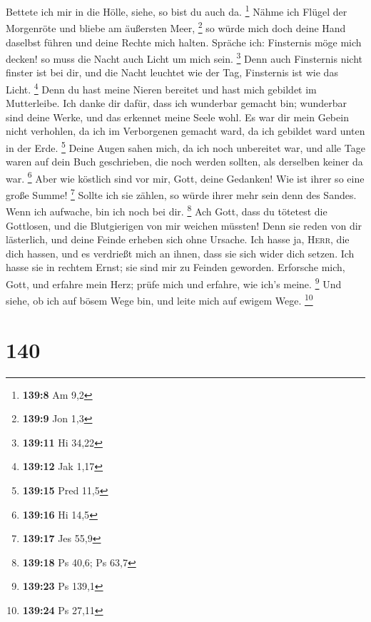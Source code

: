 Bettete ich mir in die Hölle, siehe, so bist du auch da. \footnote{\textbf{139:8}
  Am 9,2}  Nähme ich Flügel der Morgenröte und bliebe am
äußersten Meer, \footnote{\textbf{139:9} Jon 1,3}  so
würde mich doch deine Hand daselbst führen und deine Rechte mich halten.
 Spräche ich: Finsternis möge mich decken! so muss die
Nacht auch Licht um mich sein. \footnote{\textbf{139:11} Hi 34,22}
 Denn auch Finsternis nicht finster ist bei dir, und die
Nacht leuchtet wie der Tag, Finsternis ist wie das Licht. \footnote{\textbf{139:12}
  Jak 1,17}  Denn du hast meine Nieren bereitet und hast
mich gebildet im Mutterleibe.  Ich danke dir dafür, dass
ich wunderbar gemacht bin; wunderbar sind deine Werke, und das erkennet
meine Seele wohl.  Es war dir mein Gebein nicht
verhohlen, da ich im Verborgenen gemacht ward, da ich gebildet ward
unten in der Erde. \footnote{\textbf{139:15} Pred 11,5} 
Deine Augen sahen mich, da ich noch unbereitet war, und alle Tage waren
auf dein Buch geschrieben, die noch werden sollten, als derselben keiner
da war. \footnote{\textbf{139:16} Hi 14,5}  Aber wie
köstlich sind vor mir, Gott, deine Gedanken! Wie ist ihrer so eine große
Summe! \footnote{\textbf{139:17} Jes 55,9}  Sollte ich
sie zählen, so würde ihrer mehr sein denn des Sandes. Wenn ich aufwache,
bin ich noch bei dir. \footnote{\textbf{139:18} Ps 40,6; Ps 63,7}
 Ach Gott, dass du tötetest die Gottlosen, und die
Blutgierigen von mir weichen müssten!  Denn sie reden von
dir lästerlich, und deine Feinde erheben sich ohne Ursache.
 Ich hasse ja, \textsc{Herr}, die dich hassen, und es
verdrießt mich an ihnen, dass sie sich wider dich setzen.
 Ich hasse sie in rechtem Ernst; sie sind mir zu Feinden
geworden.  Erforsche mich, Gott, und erfahre mein Herz;
prüfe mich und erfahre, wie ich's meine. \footnote{\textbf{139:23} Ps
  139,1}  Und siehe, ob ich auf bösem Wege bin, und leite
mich auf ewigem Wege. \footnote{\textbf{139:24} Ps 27,11}

\hypertarget{section-43}{%
\section{140}\label{section-43}}

